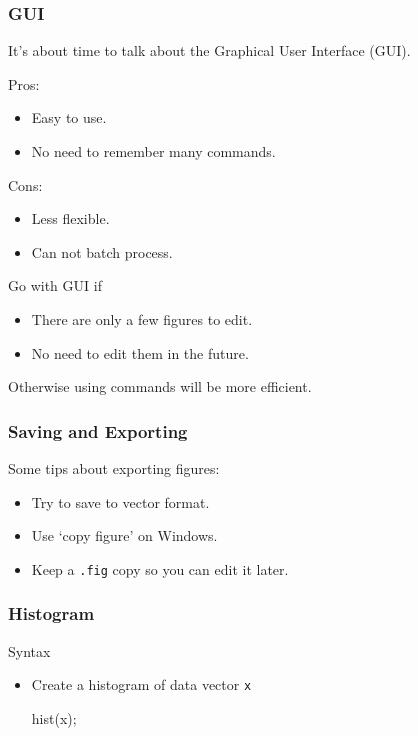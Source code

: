 \documentclass[compress]{beamer}  %
\begin{document}
\begin{frame}[fragile]
\frametitle{GUI}
It's about time to talk about the Graphical User Interface (GUI).

Pros:
\begin{itemize}
    \item Easy to use.
    \item No need to remember many commands.
\end{itemize}
\pause
Cons:
\begin{itemize}
    \item Less flexible.
    \item Can not batch process.
\end{itemize}
\pause
\begin{block}{Go with GUI if}
\begin{itemize}
    \item There are only a few figures to edit.
    \item No need to edit them in the future.
\end{itemize}

Otherwise using commands will be more efficient.
\end{block}
\end{frame}
\begin{frame}[fragile]
\frametitle{Saving and Exporting}
Some tips about exporting figures:
\begin{itemize}[<+->]
    \item Try to save to vector format.
    \item Use `copy figure' on Windows.
    \item Keep a \texttt{.fig} copy so you can edit it later.
\end{itemize}

\end{frame}
\begin{frame}[fragile]
\frametitle{Histogram}

\begin{block}{Syntax}
\begin{itemize}[<+->]
    \item Create a histogram of data vector \texttt{x}
          \begin{matlabcodebeamer}[numbers=none,frame=none]
          hist(x);
          \end{matlabcodebeamer}
\end{itemize}
\end{block}

\end{frame}
\end{document}

